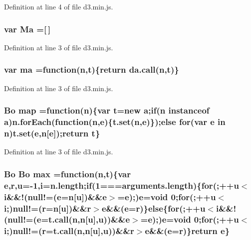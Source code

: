 Definition at line 4 of file d3.\+min.\+js.

\subsubsection[{Ma}]{\setlength{\rightskip}{0pt plus 5cm}var Ma =[$\,$]}\label{d3_8min_8js_a32631095993052ff2477b62431244335}


Definition at line 3 of file d3.\+min.\+js.

\subsubsection[{ma}]{\setlength{\rightskip}{0pt plus 5cm}var ma =function({\bf n},t)\{{\bf return} {\bf da.\+call}({\bf n},t)\}}\label{d3_8min_8js_a2da613966ea4bf4d8c0f04df8b71ade1}


Definition at line 3 of file d3.\+min.\+js.

\subsubsection[{map}]{ {\bf Bo} map =function({\bf n})\{var t=new {\bf a};{\bf if}({\bf n} instanceof {\bf a}){\bf n.\+for\+Each}(function({\bf n},{\bf e})\{{\bf t.\+set}({\bf n},{\bf e})\});{\bf else} {\bf for}(var {\bf e} in {\bf n}){\bf t.\+set}({\bf e},{\bf n}[{\bf e}]);{\bf return} t\}}\label{d3_8min_8js_a98d3c3705f20a781ba52ac2ee8381283}


Definition at line 3 of file d3.\+min.\+js.

\subsubsection[{max}]{ {\bf Bo} {\bf Bo} max =function({\bf n},t)\{var {\bf e},{\bf r},u=-\/1,{\bf i}=n.\+length;{\bf if}(1===arguments.\+length)\{{\bf for}(;++u$<${\bf i}\&\&!(null!=({\bf e}={\bf n}[u])\&\&{\bf e}$>$={\bf e});){\bf e}=void 0;{\bf for}(;++u$<${\bf i};)null!=({\bf r}={\bf n}[u])\&\&{\bf r}$>${\bf e}\&\&({\bf e}={\bf r})\}{\bf else}\{{\bf for}(;++u$<${\bf i}\&\&!(null!=({\bf e}={\bf t.\+call}({\bf n},{\bf n}[u],u))\&\&{\bf e}$>$={\bf e});){\bf e}=void 0;{\bf for}(;++u$<${\bf i};)null!=({\bf r}={\bf t.\+call}({\bf n},{\bf n}[u],u))\&\&{\bf r}$>${\bf e}\&\&({\bf e}={\bf r})\}{\bf return} {\bf e}\}}\label{d3_8min_8js_aca01f0c132584b5ae4457db8e4c81550}


